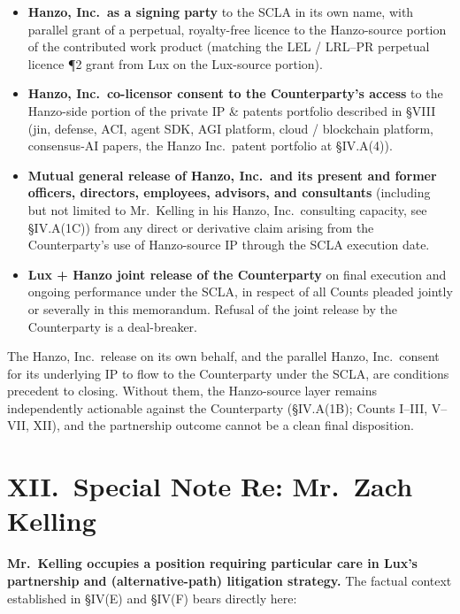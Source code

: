 \documentclass[11pt,letterpaper]{article}
\begin{document}
\begin{itemize}[leftmargin=2em,itemsep=0.1em]
\item \textbf{Hanzo, Inc.\ as a signing party} to the SCLA in its
own name, with parallel grant of a perpetual, royalty-free
licence to the Hanzo-source portion of the contributed work
product (matching the LEL / LRL--PR perpetual licence ¶2 grant
from Lux on the Lux-source portion).
\item \textbf{Hanzo, Inc.\ co-licensor consent to the Counterparty's
access} to the Hanzo-side portion of the private IP \& patents
portfolio described in \S VIII (jin, defense, ACI, agent SDK, AGI
platform, cloud / blockchain platform, consensus-AI papers, the
Hanzo Inc.\ patent portfolio at \S IV.A(4)).
\item \textbf{Mutual general release of Hanzo, Inc.\ and its
present and former officers, directors, employees, advisors, and
consultants} (including but not limited to Mr.\ Kelling in his
Hanzo, Inc.\ consulting capacity, see \S IV.A(1C)) from any
direct or derivative claim arising from the Counterparty's use of
Hanzo-source IP through the SCLA execution date.
\item \textbf{Lux + Hanzo joint release of the Counterparty} on
final execution and ongoing performance under the SCLA, in
respect of all Counts pleaded jointly or severally in this
memorandum. Refusal of the joint release by the Counterparty is
a deal-breaker.
\end{itemize}

The Hanzo, Inc.\ release on its own behalf, and the parallel
Hanzo, Inc.\ consent for its underlying IP to flow to the
Counterparty under the SCLA, are conditions precedent to closing.
Without them, the Hanzo-source layer remains independently
actionable against the Counterparty (\S IV.A(1B); Counts I--III,
V--VII, XII), and the partnership outcome cannot be a clean
final disposition.

\section*{XII.\ Special Note Re: Mr.\ Zach Kelling}

\textbf{Mr.\ Kelling occupies a position requiring particular care
in Lux's partnership and (alternative-path) litigation strategy.}
The factual context established in \S IV(E) and \S IV(F) bears
directly here:
\end{document}
